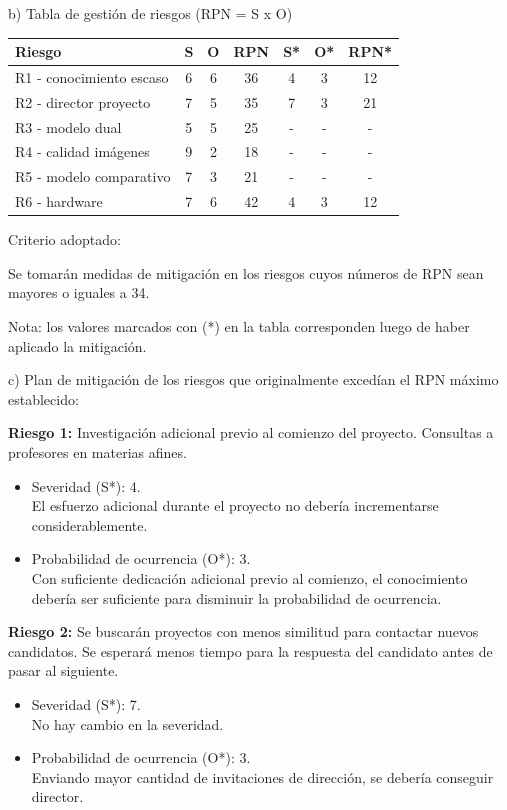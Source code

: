 \documentclass[
11pt, %
]{charter}
\begin{document}
b) Tabla de gestión de riesgos (RPN = S x O)

\begin{table}[htpb]
\centering
\begin{tabularx}{\linewidth}{@{}|X|c|c|c|c|c|c|@{}}
\hline
\rowcolor[HTML]{C0C0C0} 
Riesgo & S & O & RPN & S* & O* & RPN* \\ \hline
R1 - conocimiento escaso & 6  & 6  &  36   &  4  &  3  &  12    \\ \hline
R2 - director proyecto   & 7  & 5  &  35   &  7  &  3  &  21    \\ \hline
R3 - modelo dual         & 5  & 5  &  25   &  -  &  -  &  -    \\ \hline
R4 - calidad imágenes    & 9  & 2  &  18   &  -  &  -  &  -    \\ \hline
R5 - modelo comparativo  & 7  & 3  &  21   &  -  &  -  &  -    \\ \hline
R6 - hardware  			 & 7  & 6  &  42   &  4  &  3  &  12    \\ \hline
\end{tabularx}
\end{table}

Criterio adoptado: 

Se tomarán medidas de mitigación en los riesgos cuyos números de RPN sean mayores o iguales a 34.

Nota: los valores marcados con (*) en la tabla corresponden luego de haber aplicado la mitigación.

c) Plan de mitigación de los riesgos que originalmente excedían el RPN máximo establecido:
 
\textbf{Riesgo 1:} Investigación adicional previo al comienzo del proyecto. Consultas a profesores en materias afines.
  \begin{itemize}
	\item Severidad (S*): 4. \\
          El esfuerzo adicional durante el proyecto no debería incrementarse considerablemente.
	\item Probabilidad de ocurrencia (O*): 3. \\
          Con suficiente dedicación adicional previo al comienzo, el conocimiento debería ser suficiente para disminuir la probabilidad de ocurrencia.
	\end{itemize}

\textbf{Riesgo 2:} Se buscarán proyectos con menos similitud para contactar nuevos candidatos. Se esperará menos tiempo para la respuesta del candidato antes de pasar al siguiente.
  \begin{itemize}
	\item Severidad (S*): 7. \\
          No hay cambio en la severidad.
	\item Probabilidad de ocurrencia (O*): 3. \\
          Enviando mayor cantidad de invitaciones de dirección, se debería conseguir director.
	\end{itemize}
\end{document}
